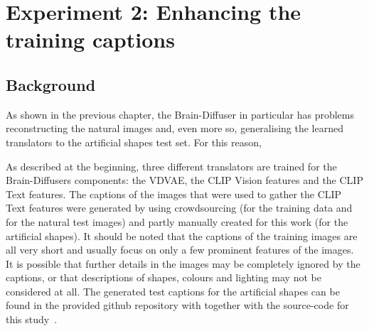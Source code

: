\section{Experiment 2: Enhancing the training captions}

\subsection{Background}

As shown in the previous chapter, the Brain-Diffuser in particular has problems reconstructing the natural images and, even more so, generalising the learned translators to the artificial shapes test set. 
 For this reason, 

As described at the beginning, three different translators are trained for the Brain-Diffusers components: the VDVAE, the CLIP Vision features and the CLIP Text features. The captions of the images that were used to gather the CLIP Text features were generated by using crowdsourcing (for the training data and for the natural test images) and partly manually created for this work (for the artificial shapes). It should be noted that the captions of the training images are all very short and usually focus on only a few prominent features of the images. It is possible that further details in the images may be completely ignored by the captions, or that descriptions of shapes, colours and lighting may not be considered at all. The generated test captions for the artificial shapes can be found in the provided github repository with together with the source-code for this study~\cite{mildenbergerKamitaniLabBrain_diffuser}.

